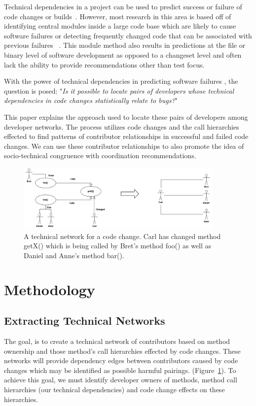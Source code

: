 \documentclass[conference]{IEEEtran}
\begin{document}
Technical dependencies in a project can be used to predict success or failure of 
code changes or builds~\cite{Pinzger:2008:DNP, Zimmermann:2008:PDU}. However, most 
research in this area is based off of identifying
central modules inside a large code base which are likely to cause software failures or
detecting frequently changed code that can be associated with previous failures
~\cite{Kim:2006:AIB}. 
This module method also results in predictions 
at the file or binary level of software development as opposed to a changeset level
and often lack the ability to provide recommendations other than test focus.

With the power of technical dependencies in predicting software failures , the question is posed: 
"\textit{Is it possible to locate pairs of developers whose technical dependencies in code changes
statistically relate to bugs?}"

This paper explains the approach used to locate these pairs of developers among developer networks.
The process utilizes code changes and the call hierarchies effected  to find patterns of contributor 
relationships in successful and failed code changes.  We can use these contributor relationships 
to also promote the idea of socio-technical congruence with coordination recommendations.

\begin{figure}[tb!]
\centering
\includegraphics[width=0.9\textwidth]{images/TecNetwork}
\caption{A technical network for a code change. Carl has changed method getX() which is being
called by Bret's method foo() as well as Daniel and Anne's method bar().\label{fig:network}}
\end{figure}

\section{Methodology}

\subsection{Extracting Technical Networks}
The goal, is to create a technical network of contributors based on method ownership
and those method's call hierarchies effected by code changes. These networks will provide
dependency edges between contributors caused by code changes which may be 
identified as possible harmful pairings. (Figure~\ref{fig:network}). To achieve this goal,
we must identify developer owners of methods, method call hierarchies (our technical
dependencies) and code change effects on these hierarchies.
\end{document}
